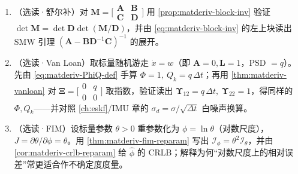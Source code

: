 \begin{practice}
\begin{enumerate}
  \item （选读·舒尔补）对 $\mathbf{M}=\big[\begin{smallmatrix}\mathbf{A}&\mathbf{B}\\\mathbf{C}&\mathbf{D}\end{smallmatrix}\big]$ 用 \cref{prop:matderiv-block-inv} 验证 $\det\mathbf{M}=\det\mathbf{D}\det(\mathbf{M}/\mathbf{D})$，并由 \cref{eq:matderiv-block-inv} 的左上块读出 SMW 引理 $(\mathbf{A}-\mathbf{B}\mathbf{D}^{-1}\mathbf{C})^{-1}$ 的展开。
  \item （选读·Van Loan）取标量随机游走 $\dot x=w$（即 $\mathbf{A}=0,\mathbf{L}=1$，PSD $=q$）。先由 \cref{eq:matderiv-PhiQ-def} 手算 $\Phi=1,\ Q_k=q\,\Delta t$；再用 \cref{thm:matderiv-vanloan} 对 $\boldsymbol{\Xi}=\big[\begin{smallmatrix}0&q\\0&0\end{smallmatrix}\big]$ 取指数，验证读出 $\boldsymbol{\Upsilon}_{12}=q\,\Delta t,\ \boldsymbol{\Upsilon}_{22}=1$，得同样的 $\Phi,Q_k$——并对照 \cref{ch:eskf}/IMU 章的 $\sigma_d=\sigma/\sqrt{\Delta t}$ 白噪声换算。
  \item （选读·FIM）设标量参数 $\theta>0$ 重参数化为 $\phi=\ln\theta$（对数尺度），$J=\partial\theta/\partial\phi=\theta$。用 \cref{thm:matderiv-fim-reparam} 写出 $\mathcal{I}_\phi=\theta^2\mathcal{I}_\theta$，并由 \cref{cor:matderiv-crlb-reparam} 给 $\hat\phi$ 的 CRLB；解释为何“对数尺度上的相对误差”常更适合作不确定度度量。
\end{enumerate}
\end{practice}
